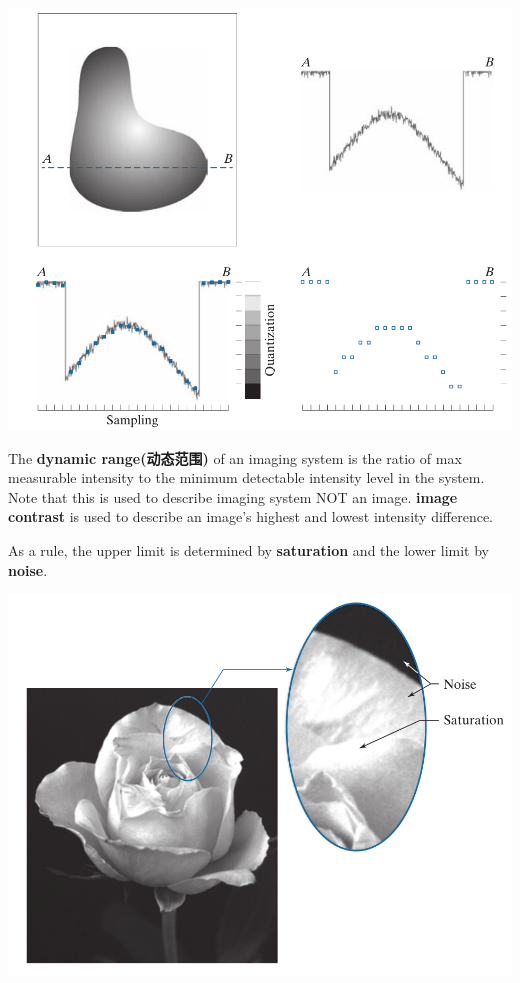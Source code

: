 \documentclass[UTF8]{ctexart}
\begin{document}
\begin{center}
	\includegraphics[scale=0.5]{digitization.png}
\end{center}

\begin{definition}
	The \textbf{dynamic range(动态范围)} of an imaging system is the ratio of max measurable intensity to the minimum detectable intensity level in the system. Note that this is used to describe imaging system NOT an image. 
	\textbf{image contrast} is used to describe an image's highest and lowest intensity difference.
\end{definition}
As a rule, the upper limit is determined by \textbf{saturation} and the lower limit by \textbf{noise}.

\begin{center}
\includegraphics[scale=0.5]{dynamic_range.png}
\end{center}
\end{document}
